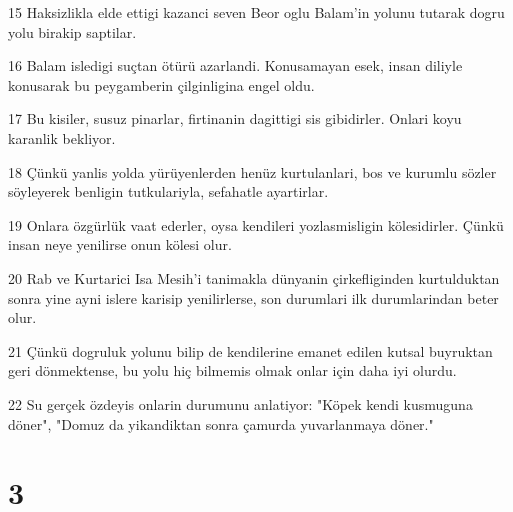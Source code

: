 \par 15 Haksizlikla elde ettigi kazanci seven Beor oglu Balam'in yolunu tutarak dogru yolu birakip saptilar.
\par 16 Balam isledigi suçtan ötürü azarlandi. Konusamayan esek, insan diliyle konusarak bu peygamberin çilginligina engel oldu.
\par 17 Bu kisiler, susuz pinarlar, firtinanin dagittigi sis gibidirler. Onlari koyu karanlik bekliyor.
\par 18 Çünkü yanlis yolda yürüyenlerden henüz kurtulanlari, bos ve kurumlu sözler söyleyerek benligin tutkulariyla, sefahatle ayartirlar.
\par 19 Onlara özgürlük vaat ederler, oysa kendileri yozlasmisligin kölesidirler. Çünkü insan neye yenilirse onun kölesi olur.
\par 20 Rab ve Kurtarici Isa Mesih'i tanimakla dünyanin çirkefliginden kurtulduktan sonra yine ayni islere karisip yenilirlerse, son durumlari ilk durumlarindan beter olur.
\par 21 Çünkü dogruluk yolunu bilip de kendilerine emanet edilen kutsal buyruktan geri dönmektense, bu yolu hiç bilmemis olmak onlar için daha iyi olurdu.
\par 22 Su gerçek özdeyis onlarin durumunu anlatiyor: "Köpek kendi kusmuguna döner", "Domuz da yikandiktan sonra çamurda yuvarlanmaya döner."

\chapter{3}

